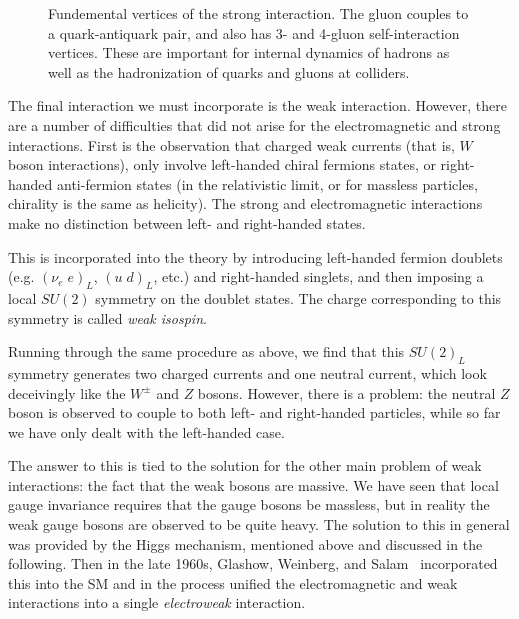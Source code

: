 \begin{figure}[ht]
  \addtolength{\abovecaptionskip}{5mm}
  \centering
  \vskip5mm
  
  
  
    \caption{Fundemental vertices of the strong interaction. The gluon couples to a quark-antiquark
      pair, and also has 3- and 4-gluon self-interaction vertices. These are important for internal
      dynamics of hadrons as well as the hadronization of quarks and gluons at colliders.
            }
    \label{fig:strong_diagrams}
\end{figure}

The final interaction we must incorporate is the weak interaction. However, there are a number of difficulties
that did not arise for the electromagnetic and strong interactions. First is the observation that charged weak
currents (that is, $W$ boson interactions), only involve left-handed chiral fermions states, 
or right-handed anti-fermion states (in the relativistic
limit, or for massless particles, chirality is the same as helicity). The strong and electromagnetic
interactions make no distinction between left- and right-handed states. 

This is incorporated into the theory
by introducing left-handed fermion doublets (e.g. $(\nu_e\;e)_L$, $(u\;d)_L$, etc.) and right-handed
singlets, and then imposing a local $SU(2)$ symmetry on the doublet states. The charge corresponding
to this symmetry is called \textit{weak isospin}.

Running through the same procedure as above, we find that this $SU(2)_L$ symmetry generates
two charged currents and one neutral current, which look deceivingly like the $W^\pm$ and $Z$
bosons. However, there is a problem: the neutral $Z$ boson is observed to couple to both left-
and right-handed particles, while so far we have only dealt with the left-handed case.

The answer to this is tied to the solution for the other main problem of weak interactions: the fact that
the weak bosons are massive. We have seen that local gauge invariance requires that the gauge bosons
be massless, but in reality the weak gauge bosons are observed to be quite heavy. The solution
to this in general was provided by the Higgs mechanism, mentioned above and discussed in the following.
Then in the late 1960s, Glashow, Weinberg, and Salam~\cite{Glashow,Weinberg,Salam} incorporated this into
the SM and in the process unified the electromagnetic and weak interactions into a single
\textit{electroweak} interaction.

